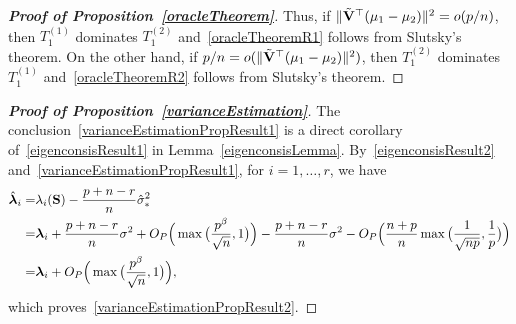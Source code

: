 \documentclass[times,sort&compress,3p]{elsarticle}
\newcommand{\bfsym}[1]{\ensuremath{\boldsymbol{#1}}}
\def\blambda {\bfsym {\lambda}}        \def\bLambda {\bfsym {\Lambda}}
\theoremstyle{plain}
\theoremstyle{definition}
\theoremstyle{remark}
\begin{document}
\begin{appendices}
\begin{proof}[\textbf{Proof of Proposition~\ref{oracleTheorem}}]
    Thus, if $\|\tilde{\mathbf{V}}^\top  (\mu_1-\mu_2)\|^2=o(p/n)$, then $T_1^{(1)}$ dominates $T_1^{(2)}$ and~\eqref{oracleTheoremR1} follows from Slutsky's theorem.
    On the other hand, if  $p/n= o(\|\tilde{\mathbf{V}}^\top (\mu_1-\mu_2)\|^2)$, then $T_1^{(2)}$ dominates $T_1^{(1)}$ and~\eqref{oracleTheoremR2} follows from Slutsky's theorem.
\end{proof}



\begin{proof}[\textbf{Proof of Proposition~\ref{varianceEstimation}}]
    The conclusion~\eqref{varianceEstimationPropResult1} is a direct corollary of~\eqref{eigenconsisResult1} in Lemma~\ref{eigenconsisLemma}.
    By~\eqref{eigenconsisResult2} and~\eqref{varianceEstimationPropResult1}, for $i=1,\ldots, r$, we have 
    $$
    \begin{aligned}
        \hat{\blambda}_i=&
        \lambda_i(\BS)-\frac{p+n-r}{n}\hat{\sigma}_*^2\\
        =& \blambda_i +\frac{p+n-r}{n}\sigma^2+O_P\Big(\max\big(\frac{p^{\beta}}{\sqrt{n}},1\big)\Big)
        -\frac{p+n-r}{n}\sigma^2-O_P\Big( \frac{n+p}{n}\max\big(\frac{1}{\sqrt{np}},\frac{1}{p}\big)\Big)\\
        =& \blambda_i+O_P\Big(\max\big(\frac{p^{\beta}}{\sqrt{n}},1\big)\Big),
    \end{aligned}
    $$
    which proves~\eqref{varianceEstimationPropResult2}.
\end{proof}




\end{appendices}
\end{document}
